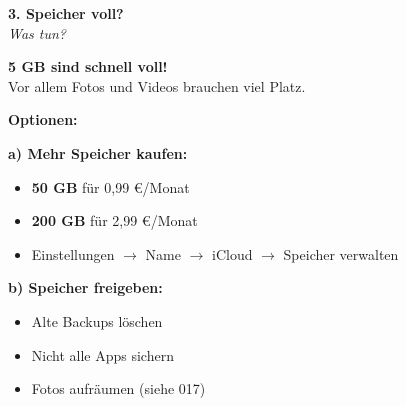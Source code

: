 \documentclass[a4paper,landscape,8pt]{extarticle}
\begin{document}
\begin{minipage}[t]{0.32\linewidth}
\begin{center}
\colorbox{storageoran!15}{%
\begin{minipage}{0.95\linewidth}
\vspace{2mm}
\begin{center}
{\Large\bfseries\textcolor{storageoran}{3. Speicher voll?}}\\[1pt]
{\footnotesize\itshape Was tun?}
\end{center}
\vspace{2mm}
\end{minipage}%
}
\end{center}

\vspace{1mm}

\textbf{5 GB sind schnell voll!}\\
Vor allem Fotos und Videos brauchen viel Platz.

\textbf{Optionen:}

\textbf{a) Mehr Speicher kaufen:}
\begin{itemize}
\item \textbf{50 GB} für 0,99 \euro/Monat
\item \textbf{200 GB} für 2,99 \euro/Monat
\item Einstellungen $\rightarrow$ Name $\rightarrow$ iCloud $\rightarrow$ Speicher verwalten
\end{itemize}

\textbf{b) Speicher freigeben:}
\begin{itemize}
\item Alte Backups löschen
\item Nicht alle Apps sichern
\item Fotos aufräumen (siehe 017)
\end{itemize}

\vspace{2mm}

\end{minipage}

\vspace{1mm}

\begin{center}
\end{center}
\end{document}
